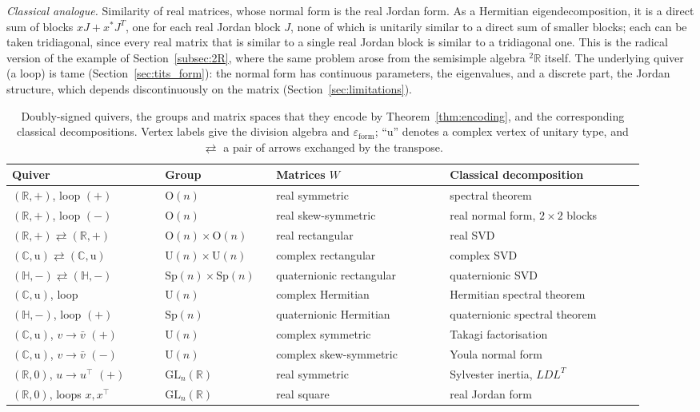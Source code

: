 \documentclass[12pt, a4paper]{report}
\theoremstyle{plain}
\theoremstyle{definition}
\theoremstyle{remark}
\theoremstyle{plain}
\newcommand{\epsilonform}{\varepsilon_{\mathrm{form}}}
\newcommand{\RR}{\mathbb{R}}
\newcommand{\CC}{\mathbb{C}}
\newcommand{\HH}{\mathbb{H}}
\newcommand{\GL}{\mathrm{GL}}
\newcommand{\Or}{\mathrm{O}}
\newcommand{\Un}{\mathrm{U}}
\newcommand{\Sp}{\mathrm{Sp}}
\newcommand{\twoR}{{}^{2}\mathbb{R}}
\newcommand{\rowrule}{\arrayrulecolor{black!30}\midrule[0.3pt]\arrayrulecolor{black}}
\begin{document}
\emph{Classical analogue.} Similarity of real matrices, whose normal form is the real Jordan form. As a Hermitian eigendecomposition, it is a direct sum of blocks $xJ+x^*J^T$, one for each real Jordan block $J$, none of which is unitarily similar to a direct sum of smaller blocks; each can be taken tridiagonal, since every real matrix that is similar to a single real Jordan block is similar to a tridiagonal one. This is the radical version of the example of Section~\ref{subsec:2R}, where the same problem arose from the semisimple algebra $\twoR$ itself. The underlying quiver (a loop) is tame (Section~\ref{sec:tits_form}): the normal form has continuous parameters, the eigenvalues, and a discrete part, the Jordan structure, which depends discontinuously on the matrix (Section~\ref{sec:limitations}).

\begin{table}[htbp]
\centering
\caption{Doubly-signed quivers, the groups and matrix spaces that they encode by Theorem~\ref{thm:encoding}, and the corresponding classical decompositions. Vertex labels give the division algebra and $\epsilonform$; ``u'' denotes a complex vertex of unitary type, and $\rightleftarrows$ a pair of arrows exchanged by the transpose.}
\label{tab:catalogue}
\small
\renewcommand{\arraystretch}{1.25}
\begin{tabular}{@{}>{\raggedright\arraybackslash}p{0.22\linewidth}>{\raggedright\arraybackslash}p{0.16\linewidth}>{\raggedright\arraybackslash}p{0.25\linewidth}>{\raggedright\arraybackslash}p{0.29\linewidth}@{}}
\toprule
\textbf{Quiver} & \textbf{Group} & \textbf{Matrices $W$} & \textbf{Classical decomposition} \\
\midrule
$(\RR,+)$, loop $(+)$ & $\Or(n)$ & real symmetric & spectral theorem \\
$(\RR,+)$, loop $(-)$ & $\Or(n)$ & real skew-symmetric & real normal form, $2\times2$ blocks \\
\rowrule
$(\RR,+)\rightleftarrows(\RR,+)$ & $\Or(n)\times\Or(n)$ & real rectangular & real SVD \\
$(\CC,\mathrm{u})\rightleftarrows(\CC,\mathrm{u})$ & $\Un(n)\times\Un(n)$ & complex rectangular & complex SVD \\
$(\HH,-)\rightleftarrows(\HH,-)$ & $\Sp(n)\times\Sp(n)$ & quaternionic rectangular & quaternionic SVD \\
\rowrule
$(\CC,\mathrm{u})$, loop & $\Un(n)$ & complex Hermitian & Hermitian spectral theorem \\
$(\HH,-)$, loop $(+)$ & $\Sp(n)$ & quaternionic Hermitian & quaternionic spectral theorem \\
\rowrule
$(\CC,\mathrm{u})$, $v\to\bar v$ $(+)$ & $\Un(n)$ & complex symmetric & Takagi factorisation \\
$(\CC,\mathrm{u})$, $v\to\bar v$ $(-)$ & $\Un(n)$ & complex skew-symmetric & Youla normal form \\
\rowrule
$(\RR,0)$, $u\to u^{\top}$ $(+)$ & $\GL_n(\RR)$ & real symmetric & Sylvester inertia, $LDL^T$ \\
$(\RR,0)$, loops $x,x^{\top}$ & $\GL_n(\RR)$ & real square & real Jordan form \\
\bottomrule
\end{tabular}
\end{table}
\end{document}
